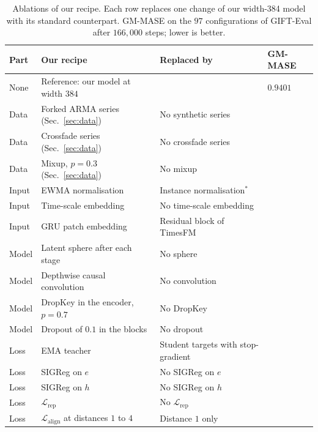 \begin{table}[!htb]
  \centering
  \caption{Ablations of our recipe. Each row replaces one change of
    our width-384 model with its standard counterpart. GM-MASE on
    the $97$ configurations of GIFT-Eval after $166{,}000$ steps; lower
    is better.}
  \label{tab:ablation}
  \small
  \begin{tabular}{llll}
    \toprule
    Part & Our recipe & Replaced by & GM-MASE \\
    \midrule
    None & Reference: our model at width $384$ & & $0.9401$ \\
    \midrule
    Data & Forked ARMA series (Sec.~\ref{sec:data}) & No synthetic series & \\
    Data & Crossfade series (Sec.~\ref{sec:data}) & No crossfade series & \\
    Data & Mixup, $p = 0.3$ (Sec.~\ref{sec:data}) & No mixup & \\
    \midrule
    Input & EWMA normalisation & Instance normalisation$^{*}$ & \\
    Input & Time-scale embedding & No time-scale embedding & \\
    Input & GRU patch embedding & Residual block of TimesFM & \\
    \midrule
    Model & Latent sphere after each stage & No sphere & \\
    Model & Depthwise causal convolution & No convolution & \\
    Model & DropKey in the encoder, $p = 0.7$ & No DropKey & \\
    Model & Dropout of $0.1$ in the blocks & No dropout & \\
    \midrule
    Loss & EMA teacher & Student targets with stop-gradient & \\
    Loss & SIGReg on $e$ & No SIGReg on $e$ & \\
    Loss & SIGReg on $h$ & No SIGReg on $h$ & \\
    Loss & $\mathcal{L}_{\mathrm{rep}}$ & No $\mathcal{L}_{\mathrm{rep}}$ & \\
    Loss & $\mathcal{L}_{\mathrm{align}}$ at distances $1$ to $4$ & Distance $1$ only & \\
    \bottomrule
  \end{tabular}
\end{table}
